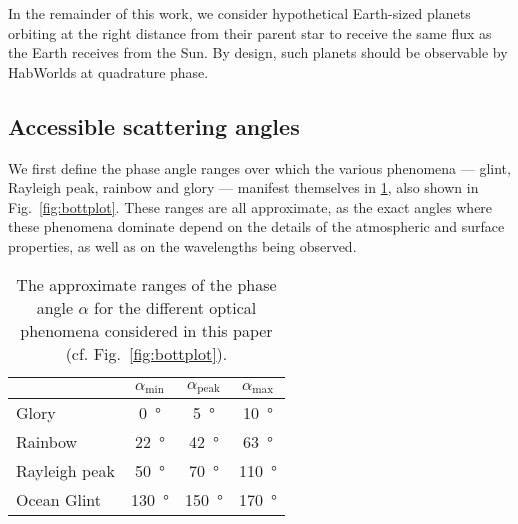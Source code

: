 \documentclass[usenatbib]{mnras}
\newcommand{\IWA}{\ensuremath{\mathrm{IWA}}\xspace}
\newcommand{\HWO}{HabWorlds\xspace}
\begin{document}
In the remainder of this work, we consider hypothetical Earth-sized planets orbiting at the right distance from their parent star to receive the same flux as the Earth receives from the Sun.
By design, such planets should be observable by \HWO at quadrature phase. %


\subsection{Accessible scattering angles}
\label{subsec:2.2}

We first define the phase angle ranges over which the various phenomena --- glint, Rayleigh peak, rainbow and glory --- manifest themselves in \cref{tab:phase_ranges}, also shown in Fig.~\ref{fig:bottplot}. 
These ranges are all approximate, as the exact angles where these phenomena dominate depend on the details of the atmospheric and surface properties, as well as on the wavelengths being observed.

\begin{table}
    \centering
    \caption{
        The approximate ranges of the phase angle $\alpha$ for the different optical phenomena considered in this paper (cf. Fig.~\ref{fig:bottplot}).
    }
    \label{tab:phase_ranges}
    \begin{tabular}{ l c c c } 
        \toprule
        & $\alpha_\mathrm{min}$ & $\alpha_\mathrm{peak}$ & $\alpha_\mathrm{max}$ \\
        \midrule
        \midrule
        Glory       & \qty{0}{\degree}     & \qty{5}{\degree}     & \qty{10}{\degree} \\
        Rainbow    & \qty{22}{\degree}    & \qty{42}{\degree}    & \qty{63}{\degree} \\
        Rayleigh peak    & \qty{50}{\degree}    & \qty{70}{\degree}    & \qty{110}{\degree} \\
        Ocean Glint & \qty{130}{\degree}   & \qty{150}{\degree}   & \qty{170}{\degree} \\
        \bottomrule
    \end{tabular}
\end{table}
\end{document}
